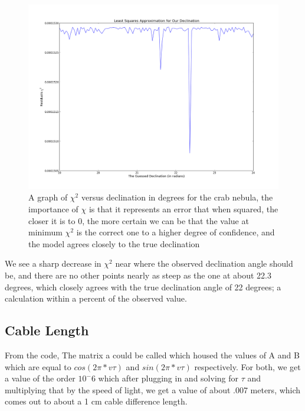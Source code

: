 \documentclass[12 pt]{article}
\begin{document}
\begin{figure}[H]
\centering
\includegraphics[scale=0.45]{crabdec.png}
\caption{A graph of $\chi^2$ versus declination in degrees for the crab nebula, the
  importance of $\chi$ is that it represents an error that when squared, the closer it is to 0, the more certain we can be that the
  value at minimum $\chi^2$ is the correct one to a higher degree of confidence, and the model agrees
  closely to the true declination}
\label{crabdec}
\end{figure} 
We see a sharp decrease in $\chi^2$ near where the observed declination
angle should be, and there are no other points nearly as steep as the one
at about 22.3 degrees, which closely agrees with the true declination
angle of 22 degrees; a calculation within a percent of the observed
value.
\subsection*{Cable Length}
From the code, The matrix a could be called which housed the values of A
and B  which are equal to $cos(2\pi*v\tau)$ and $sin(2\pi*v\tau)$
respectively. For both, we get a value of the order $10^-6$ which after
plugging in and solving for $\tau$ and multiplying that by the speed of
light,  we get a value of about .007 meters,  which comes out to about a
1 cm cable difference length. 
\end{document}
